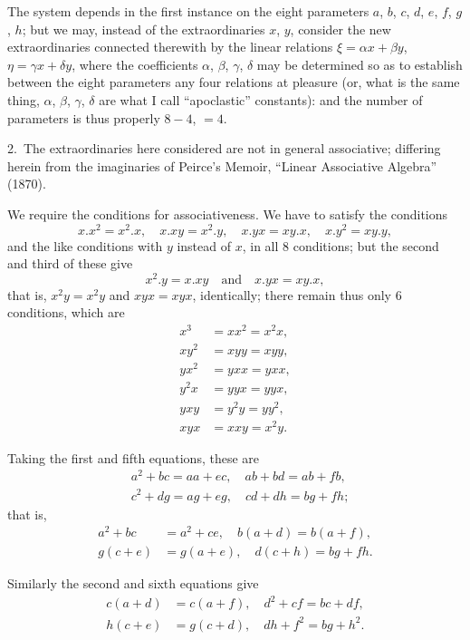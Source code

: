 \documentclass[11pt,a4paper]{article}
\theoremstyle{plain}
\theoremstyle{definition}
\theoremstyle{remark}
\begin{document}
The system depends in the first instance on the eight parameters $a$, $b$, $c$, $d$, $e$, $f$, $g$, $h$; but we may, instead of the extraordinaries $x$, $y$, consider the new extraordinaries connected therewith by the linear relations $\xi = \alpha x + \beta y$, $\eta = \gamma x + \delta y$, where the coefficients $\alpha$, $\beta$, $\gamma$, $\delta$ may be determined so as to establish between the eight parameters any four relations at pleasure (or, what is the same thing, $\alpha$, $\beta$, $\gamma$, $\delta$ are what I call ``apoclastic'' constants): and the number of parameters is thus properly $8 - 4$, $= 4$.

2.~The extraordinaries here considered are not in general associative; differing herein from the imaginaries of Peirce's Memoir, ``Linear Associative Algebra'' (1870).

We require the conditions for associativeness. We have to satisfy the conditions
\[
x.x^2 = x^2.x,\quad x.xy = x^2.y,\quad x.yx = xy.x,\quad x.y^2 = xy.y,
\]
and the like conditions with $y$ instead of $x$, in all 8 conditions; but the second and third of these give
\[
x^2.y = x.xy\quad\text{and}\quad x.yx = xy.x,
\]
that is, $x^2y = x^2y$ and $xyx = xyx$, identically; there remain thus only 6 conditions, which are
\begin{align*}
x^3 &= xx^2 = x^2x,\\
xy^2 &= xyy = xyy,\\
yx^2 &= yxx = yxx,\\
y^2x &= yyx = yyx,\\
yxy &= y^2y = yy^2,\\
xyx &= xxy = x^2y.
\end{align*}

Taking the first and fifth equations, these are
\begin{align*}
&a^2 + bc = aa + ec,\quad ab + bd = ab + fb,\\
&c^2 + dg = ag + eg,\quad cd + dh = bg + fh;
\end{align*}
that is,
\begin{align*}
a^2 + bc &= a^2 + ce,\quad b(a + d) = b(a + f),\\
g(c + e) &= g(a + e),\quad d(c + h) = bg + fh.
\end{align*}

Similarly the second and sixth equations give
\begin{align*}
c(a + d) &= c(a + f),\quad d^2 + cf = bc + df,\\
h(c + e) &= g(c + d),\quad dh + f^2 = bg + h^2.
\end{align*}
\end{document}
